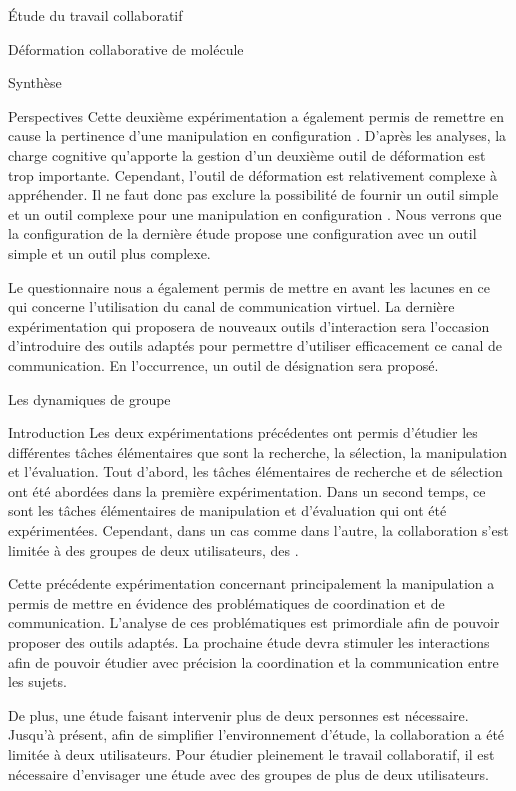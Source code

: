 \documentclass[myfrancais]{mythesis}
\begin{document}
\begin{mypart}{Étude du travail collaboratif}
\begin{mychapter}{Déformation collaborative de molécule}
\begin{mysection}{Synthèse}
\begin{mysubsection}{Perspectives}
					Cette deuxième expérimentation a également permis de remettre en cause la pertinence d'une manipulation en configuration .
					D'après les analyses, la charge cognitive qu'apporte la gestion d'un deuxième outil de déformation est trop importante.
					Cependant, l'outil de déformation est relativement complexe à appréhender.
					Il ne faut donc pas exclure la possibilité de fournir un outil simple et un outil complexe pour une manipulation en configuration .
					Nous verrons que la configuration de la dernière étude  propose une configuration  avec un outil simple et un outil plus complexe.

					Le questionnaire nous a également permis de mettre en avant les lacunes en ce qui concerne l'utilisation du canal de communication virtuel.
					La dernière expérimentation qui proposera de nouveaux outils d'interaction sera l'occasion d'introduire des outils adaptés pour permettre d'utiliser efficacement ce canal de communication.
					En l'occurrence, un outil de désignation sera proposé.
				\end{mysubsection}
			\end{mysection}
		\end{mychapter}
		\begin{mychapter}{Les dynamiques de groupe}
			\begin{mysection}{Introduction}
				Les deux expérimentations précédentes ont permis d'étudier les différentes tâches élémentaires que sont la recherche, la sélection, la manipulation et l'évaluation.
				Tout d'abord, les tâches élémentaires de recherche et de sélection ont été abordées dans la première expérimentation.
				Dans un second temps, ce sont les tâches élémentaires de manipulation et d'évaluation qui ont été expérimentées.
				Cependant, dans un cas comme dans l'autre, la collaboration s'est limitée à des groupes de deux utilisateurs, des .

				Cette précédente expérimentation concernant principalement la manipulation a permis de mettre en évidence des problématiques de coordination et de communication.
				L'analyse de ces problématiques est primordiale afin de pouvoir proposer des outils adaptés.
				La prochaine étude devra stimuler les interactions afin de pouvoir étudier avec précision la coordination et la communication entre les sujets.

				De plus, une étude faisant intervenir plus de deux personnes est nécessaire.
				Jusqu'à présent, afin de simplifier l'environnement d'étude, la collaboration a été limitée à deux utilisateurs.
				Pour étudier pleinement le travail collaboratif, il est nécessaire d'envisager une étude avec des groupes de plus de deux utilisateurs.


\end{mysection}
\end{mychapter}
\end{mypart}
\end{document}
